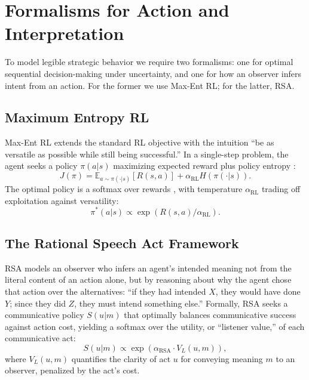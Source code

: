 \documentclass{article}
\newcommand{\VL}{V_L}
\newcommand{\AlphaRL}{\alpha_{\text{RL}}}
\newcommand{\AlphaRSA}{\alpha_{\text{RSA}}}
\begin{document}
\section{Formalisms for Action and Interpretation}
\label{sec:background}

To model legible strategic behavior we require two formalisms: one for optimal sequential decision-making under uncertainty, and one for how an observer infers intent from an action. For the former we use Max-Ent RL; for the latter, RSA.

\subsection{Maximum Entropy RL}
\label{ssec:maxentrl}

Max-Ent RL extends the standard RL objective with the intuition ``be as versatile as possible while still being successful.'' In a single-step problem, the agent seeks a policy $\pi(a|s)$ maximizing expected reward plus policy entropy \cite{haarnoja2018soft}:
\begin{equation}
J(\pi)=\mathbb{E}_{a\sim\pi(\cdot|s)}[R(s,a)]+\AlphaRL H(\pi(\cdot|s)).
\end{equation}
The optimal policy is a softmax over rewards \cite{levine2018reinforcement}, with temperature $\AlphaRL$ trading off exploitation against versatility:
\begin{equation}
\pi^{*}(a|s)\propto \exp\left(R(s,a)/\AlphaRL\right). \label{eq:maxent_policy}
\end{equation}

\subsection{The Rational Speech Act Framework}
\label{ssec:rsa}

RSA \cite{goodman2016pragmatic} models an observer who infers an agent's intended meaning not from the literal content of an action alone, but by reasoning about why the agent chose that action over the alternatives: ``if they had intended $X$, they would have done $Y$; since they did $Z$, they must intend something else.'' Formally, RSA seeks a communicative policy $S(u|m)$ that optimally balances communicative success against action cost, yielding a softmax over the utility, or ``listener value,'' of each communicative act:
\begin{equation}
S(u|m)\propto \exp(\AlphaRSA\cdot \VL(u,m)), \label{eq:rsa_policy}
\end{equation}
where $\VL(u,m)$ quantifies the clarity of act $u$ for conveying meaning $m$ to an observer, penalized by the act's cost.
\end{document}
